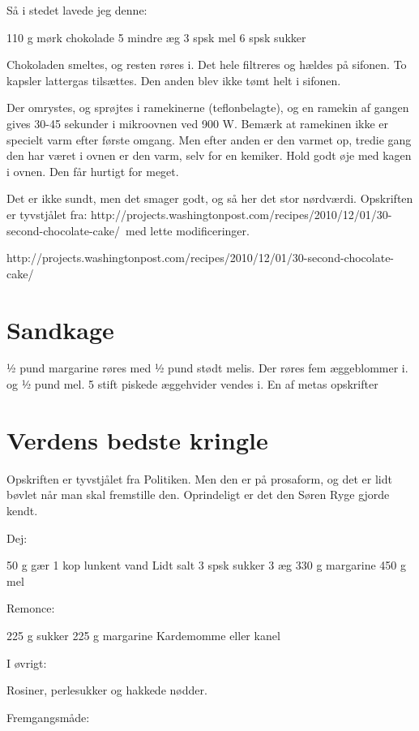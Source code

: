 \documentclass[
  letterpaper,
  DIV=11,
  numbers=noendperiod]{scrreprt}
\begin{document}
Så i stedet lavede jeg denne:

110 g mørk chokolade 5 mindre æg 3 spsk mel 6 spsk sukker

Chokoladen smeltes, og resten røres i. Det hele filtreres og hældes på
sifonen. To kapsler lattergas tilsættes. Den anden blev ikke tømt helt i
sifonen.

Der omrystes, og sprøjtes i ramekinerne (teflonbelagte), og en ramekin
af gangen gives 30-45 sekunder i mikroovnen ved 900 W. Bemærk at
ramekinen ikke er specielt varm efter første omgang. Men efter anden er
den varmet op, tredie gang den har været i ovnen er den varm, selv for
en kemiker. Hold godt øje med kagen i ovnen. Den får hurtigt for meget.

Det er ikke sundt, men det smager godt, og så her det stor nørdværdi.
Opskriften er tyvstjålet fra:
http://projects.washingtonpost.com/recipes/2010/12/01/30-second-chocolate-cake/~med
lette modificeringer.

http://projects.washingtonpost.com/recipes/2010/12/01/30-second-chocolate-cake/

\hypertarget{sandkage-1}{%
\section{Sandkage}\label{sandkage-1}}

½ pund margarine røres med ½ pund stødt melis. Der røres fem æggeblommer
i. og ½ pund mel. 5 stift piskede æggehvider vendes i. En af metas
opskrifter

\hypertarget{verdens-bedste-kringle-1}{%
\section{Verdens bedste kringle}\label{verdens-bedste-kringle-1}}

Opskriften er tyvstjålet fra Politiken. Men den er på prosaform, og det
er lidt bøvlet når man skal fremstille den. Oprindeligt er det den Søren
Ryge gjorde kendt.

Dej:

50 g gær 1 kop lunkent vand Lidt salt 3 spsk sukker 3 æg 330 g margarine
450 g mel

Remonce:

225 g sukker 225 g margarine Kardemomme eller kanel

I øvrigt:

Rosiner, perlesukker og hakkede nødder.

Fremgangsmåde:
\end{document}
